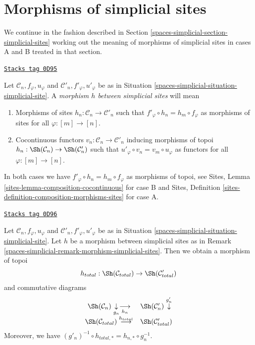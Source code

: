 \section{Morphisms of simplicial sites}
\label{spaces-simplicial-section-morphism-simplicial-sites}
We continue in the fashion described in
Section \ref{spaces-simplicial-section-simplicial-sites}
working out the meaning of morphisms of simplicial sites
in cases A and B treated in that section.

\begin{remark}
\label{spaces-simplicial-remark-morphism-simplicial-sites}
\href{https://stacks.math.columbia.edu/tag/0D95}{\texttt{Stacks tag 0D95}}

Let $\mathcal{C}_n, f_\varphi, u_\varphi$ and
$\mathcal{C}'_n, f'_\varphi, u'_\varphi$ be as in
Situation \ref{spaces-simplicial-situation-simplicial-site}. A
{\it morphism $h$ between simplicial sites} will mean
\begin{enumerate}
\item[(A)] Morphisms of sites
$h_n : \mathcal{C}_n \to \mathcal{C}'_n$
such that $f'_\varphi \circ h_n = h_m \circ f_\varphi$
as morphisms of sites for all $\varphi : [m] \to [n]$.
\item[(B)] Cocontinuous functors
$v_n : \mathcal{C}_n \to \mathcal{C}'_n$
inducing morphisms of topoi $h_n : \Sh(\mathcal{C}_n) \to \Sh(\mathcal{C}'_n)$
such that $u'_\varphi \circ v_n = v_m \circ u_\varphi$
as functors for all $\varphi : [m] \to [n]$.
\end{enumerate}
In both cases we have
$f'_\varphi \circ h_n = h_m \circ f_\varphi$
as morphisms of topoi, see
Sites, Lemma \ref{sites-lemma-composition-cocontinuous}
for case B and Sites,
Definition \ref{sites-definition-composition-morphisms-sites}
for case A.
\end{remark}

\begin{lemma}
\label{spaces-simplicial-lemma-morphism-simplicial-sites}
\href{https://stacks.math.columbia.edu/tag/0D96}{\texttt{Stacks tag 0D96}}

Let $\mathcal{C}_n, f_\varphi, u_\varphi$ and
$\mathcal{C}'_n, f'_\varphi, u'_\varphi$ be as in
Situation \ref{spaces-simplicial-situation-simplicial-site}.
Let $h$ be a morphism between simplicial sites as in
Remark \ref{spaces-simplicial-remark-morphism-simplicial-sites}.
Then we obtain a morphism of topoi
$$
h_{total} : \Sh(\mathcal{C}_{total}) \to \Sh(\mathcal{C}'_{total})
$$
and commutative diagrams
$$
\begin{array}{cc}\Sh(\mathcal{C}_n) \underset{g_n}{\downarrow}\underset{h_n}{\longrightarrow} & \Sh(\mathcal{C}'_n) \overset{g'_n}{\downarrow} \\ \Sh(\mathcal{C}_{total}) \overset{h_{total}}{\longrightarrow} & \Sh(\mathcal{C}'_{total})\end{array}
$$
Moreover, we have $(g'_n)^{-1} \circ h_{total, *} = h_{n, *} \circ g_n^{-1}$.
\end{lemma}

